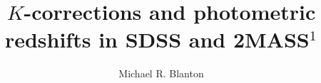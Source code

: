 \documentclass[10pt,preprint]{aastex}
\begin{document}
 
\title{$K$-corrections and photometric redshifts in SDSS and 2MASS$^1$}

\author{
Michael R. Blanton\altaffilmark{\ref{NYU}}
}
\end{document}
